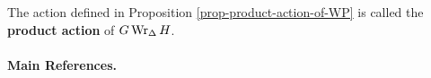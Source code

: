 \begin{definition}
	The action defined in Proposition \ref{prop-product-action-of-WP} is called the \textbf{product action} of $G\operatorname{Wr}_{\Delta} H$.
\end{definition}


\paragraph{Main References.} \cite{Meldrum1995,Praeger2018,Dixon1996}
